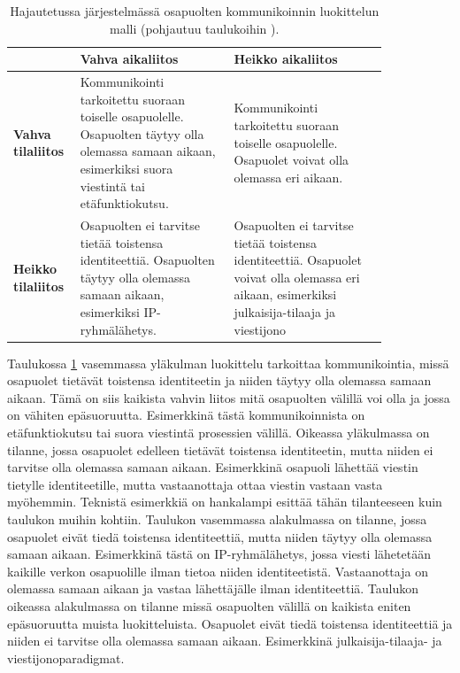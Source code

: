 \begin{table}[ht!]
	\caption{Hajautetussa järjestelmässä osapuolten kommunikoinnin luokittelun malli (pohjautuu taulukoihin \mbox{\cite[s.~231]{distributed-systems-concepts-and-design}} \mbox{\cite[s.~84]{cabri2000mobile}}).}
	\label{tab:communication-models}
	\begin{tabular}{p{0.1\linewidth} | p{0.37\linewidth} | p{0.37\linewidth}}
		\hline
		& \textbf{Vahva aikaliitos} & \textbf{Heikko aikaliitos} \\
		\hline
		\textbf{Vahva tilaliitos} & Kommunikointi tarkoitettu suoraan toiselle osapuolelle. Osapuolten täytyy olla olemassa samaan aikaan, esimerkiksi suora viestintä tai etäfunktiokutsu. & Kommunikointi tarkoitettu suoraan toiselle osapuolelle. Osapuolet voivat olla olemassa eri aikaan.\\
		\hline
		\textbf{Heikko tilaliitos} & Osapuolten ei tarvitse tietää toistensa identiteettiä. Osapuolten täytyy olla olemassa samaan aikaan, esimerkiksi IP-ryhmälähetys. & Osapuolten ei tarvitse tietää toistensa identiteettiä. Osapuolet voivat olla olemassa eri aikaan, esimerkiksi julkaisija-tilaaja ja viestijono \\
		\hline
	\end{tabular}
\end{table}

Taulukossa \ref{tab:communication-models} vasemmassa yläkulman luokittelu tarkoittaa kommunikointia, missä osapuolet tietävät toistensa identiteetin ja niiden täytyy olla olemassa samaan aikaan. Tämä on siis kaikista vahvin liitos mitä osapuolten välillä voi olla ja jossa on vähiten epäsuoruutta. Esimerkkinä tästä kommunikoinnista on etäfunktiokutsu tai suora viestintä prosessien välillä. Oikeassa yläkulmassa on tilanne, jossa osapuolet edelleen tietävät toistensa identiteetin, mutta niiden ei tarvitse olla olemassa samaan aikaan. Esimerkkinä osapuoli lähettää viestin tietylle identiteetille, mutta vastaanottaja ottaa viestin vastaan vasta myöhemmin. Teknistä esimerkkiä on hankalampi esittää tähän tilanteeseen kuin taulukon muihin kohtiin. Taulukon vasemmassa alakulmassa on tilanne, jossa osapuolet eivät tiedä toistensa identiteettiä, mutta niiden täytyy olla olemassa samaan aikaan. Esimerkkinä tästä on IP-ryhmälähetys, jossa viesti lähetetään kaikille verkon osapuolille ilman tietoa niiden identiteetistä. Vastaanottaja on olemassa samaan aikaan ja vastaa lähettäjälle ilman identiteettiä. Taulukon oikeassa alakulmassa on tilanne missä osapuolten välillä on kaikista eniten epäsuoruutta muista luokitteluista. Osapuolet eivät tiedä toistensa identiteettiä ja niiden ei tarvitse olla olemassa samaan aikaan. Esimerkkinä julkaisija-tilaaja- ja viestijonoparadigmat. \mbox{\cite[s.~230--232]{distributed-systems-concepts-and-design}} \mbox{\cite{cabri2000mobile}}

